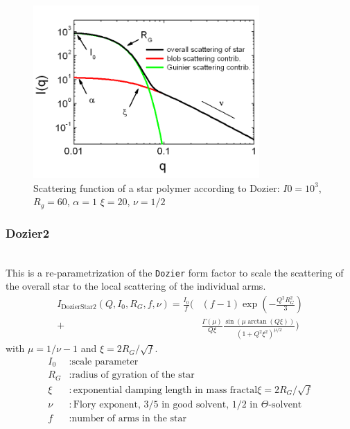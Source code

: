 \begin{figure}[htb]
\begin{center}
\includegraphics[width=0.768\textwidth,height=0.588\textwidth]{Dozier_Iq.png}
\end{center}
\caption{Scattering function of a star polymer according to Dozier: $I0=10^3$, $R_g=60$, $\alpha=1$
$\xi=20$, $\nu=1/2$ } \label{fig:IQDozierStar1}
\end{figure}

\clearpage
\subsubsection{Dozier2}
\label{sect:DozierStar2}
~\\
This is a re-parametrization of the \texttt{Dozier} form factor
to scale the scattering of the overall star to the local scattering of the individual arms.
\begin{align}
I_\text{DozierStar2}(Q,I_0,R_G,f,\nu)=
\frac{I_0}{f}
\Biggl(
 &  (f-1)
    \exp\left(-\frac{Q^2R_G^2}{3}\right) \\
 +&  \frac{\Gamma(\mu)}{Q\xi}
    \frac{\sin(\mu\arctan(Q\xi))}{(1+Q^2\xi^2)^{\mu/2}} \nonumber
\Biggr)
\end{align}
with $\mu=1/\nu-1$ and $\xi=2R_G/\sqrt{f}$.
\begin{align}
I_0      & : \text{scale parameter} \nonumber \\
R_G      & : \text{radius of gyration of the star} \nonumber \\
\xi      & : \text{exponential damping length in mass fractal} \xi=2R_G/\sqrt{f}\nonumber \\
\nu      & : \text{Flory exponent, 3/5 in good solvent, 1/2 in $\Theta$-solvent} \nonumber \\
f & : \text{number of arms in the star} \nonumber \\
\end{align}

